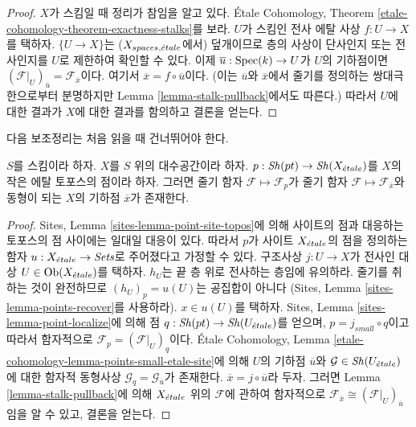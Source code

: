 \begin{proof}
$X$가 스킴일 때 정리가 참임을 알고 있다. \'Etale Cohomology,
Theorem \ref{etale-cohomology-theorem-exactness-stalks}를 보라.
$U$가 스킴인 전사 에탈 사상 $f : U \to X$를 택하자.
$\{U \to X\}$는 ($X_{spaces, {\acute{e}tale}}$에서) 덮개이므로
층의 사상이 단사인지 또는 전사인지를 $U$로 제한하여 확인할 수 있다.
이제 $\overline{u} : \mathop{\mathrm{Spec}}(k) \to U$가 $U$의 기하점이면
$(\mathcal{F}|_U)_{\overline{u}} = \mathcal{F}_{\overline{x}}$이다.
여기서 $\overline{x} = f \circ \overline{u}$이다.
(이는 $\overline{u}$와 $\overline{x}$에서 줄기를 정의하는
쌍대극한으로부터 분명하지만 Lemma
\ref{lemma-stalk-pullback}에서도 따른다.)
따라서 $U$에 대한 결과가 $X$에 대한 결과를 함의하고 결론을 얻는다.
\end{proof}

\noindent
다음 보조정리는 처음 읽을 때 건너뛰어야 한다.

\begin{lemma}
\label{lemma-points-small-etale-site}
$S$를 스킴이라 하자.
$X$를 $S$ 위의 대수공간이라 하자.
$p : \mathop{\mathit{Sh}}\nolimits(pt) \to \mathop{\mathit{Sh}}\nolimits(X_{\acute{e}tale})$를
$X$의 작은 에탈 토포스의 점이라 하자.
그러면 줄기 함자 $\mathcal{F} \mapsto \mathcal{F}_p$가
줄기 함자 $\mathcal{F} \mapsto \mathcal{F}_{\overline{x}}$와
동형이 되는 $X$의 기하점 $\overline{x}$가 존재한다.
\end{lemma}

\begin{proof}
Sites, Lemma \ref{sites-lemma-point-site-topos}에 의해 사이트의 점과
대응하는 토포스의 점 사이에는 일대일 대응이 있다.
따라서 $p$가 사이트 $X_{\acute{e}tale}$의 점을 정의하는 함자
$u : X_{\acute{e}tale} \to \textit{Sets}$로 주어졌다고 가정할 수 있다.
구조사상 $j : U \to X$가 전사인 대상
$U \in \mathop{\mathrm{Ob}}\nolimits(X_{\acute{e}tale})$를 택하자. $h_U$는 끝 층 위로 전사하는
층임에 유의하라. 줄기를 취하는 것이 완전하므로
$(h_U)_p = u(U)$는 공집합이 아니다
(Sites, Lemma \ref{sites-lemma-points-recover}를 사용하라).
$x \in u(U)$를 택하자. Sites, Lemma
\ref{sites-lemma-point-localize}에 의해 점
$q : \mathop{\mathit{Sh}}\nolimits(pt) \to \mathop{\mathit{Sh}}\nolimits(U_{\acute{e}tale})$를 얻으며,
$p = j_{small} \circ q$이고 따라서 함자적으로
$\mathcal{F}_p = (\mathcal{F}|_U)_q$이다.
\'Etale Cohomology, Lemma
\ref{etale-cohomology-lemma-points-small-etale-site}에 의해
$U$의 기하점 $\overline{u}$와
$\mathcal{G} \in \mathop{\mathit{Sh}}\nolimits(U_{\acute{e}tale})$에 대한 함자적 동형사상
$\mathcal{G}_q = \mathcal{G}_{\overline{u}}$가 존재한다.
$\overline{x} = j \circ \overline{u}$라 두자.
그러면 Lemma \ref{lemma-stalk-pullback}에 의해
$X_{\acute{e}tale}$ 위의 $\mathcal{F}$에 관하여 함자적으로
$\mathcal{F}_{\overline{x}} \cong (\mathcal{F}|_U)_{\overline{u}}$임을
알 수 있고, 결론을 얻는다.
\end{proof}

